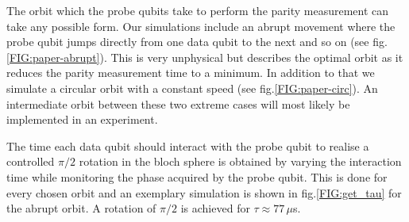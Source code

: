 The orbit which the probe qubits take to perform the parity measurement can take any possible form. Our simulations include an abrupt movement where the probe qubit jumps directly from one data qubit to the next and so on (see fig.\@ \ref{FIG:paper-abrupt}). This is very unphysical but describes the optimal orbit as it reduces the parity measurement time to a minimum. In addition to that we simulate a circular orbit with a constant speed (see fig.\@ \ref{FIG:paper-circ}). An intermediate orbit between these two extreme cases will most likely be implemented in an experiment. 

The time each data qubit should interact with the probe qubit to realise a controlled $\pi/2$ rotation in the bloch sphere is obtained by varying the interaction time while monitoring the phase acquired by the probe qubit. This is done for every chosen orbit and an exemplary simulation is shown in fig.\@ \ref{FIG:get_tau} for the abrupt orbit. A rotation of $\pi/2$ is achieved for $\tau\approx 77\, \mu$s.

